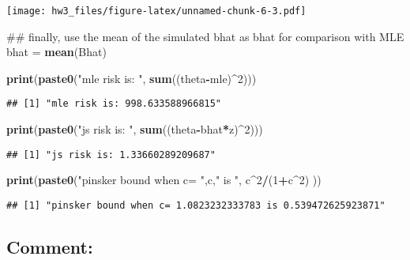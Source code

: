 \documentclass[]{article}
\newenvironment{Shaded}{\begin{snugshade}}{\end{snugshade}}
\newcommand{\KeywordTok}[1]{\textcolor[rgb]{0.13,0.29,0.53}{\textbf{#1}}}
\newcommand{\DecValTok}[1]{\textcolor[rgb]{0.00,0.00,0.81}{#1}}
\newcommand{\StringTok}[1]{\textcolor[rgb]{0.31,0.60,0.02}{#1}}
\newcommand{\OperatorTok}[1]{\textcolor[rgb]{0.81,0.36,0.00}{\textbf{#1}}}
\newcommand{\NormalTok}[1]{#1}
\begin{document}
\texttt{[image: hw3\_files/figure-latex/unnamed-chunk-6-3.pdf]}

\begin{Shaded}
\begin{Highlighting}[]
\NormalTok{## finally, use the mean of the simulated bhat as bhat for comparison with MLE  }
\NormalTok{bhat =}\StringTok{ }\KeywordTok{mean}\NormalTok{(Bhat)}

\KeywordTok{print}\NormalTok{(}\KeywordTok{paste0}\NormalTok{(}\StringTok{"mle risk is: "}\NormalTok{, }\KeywordTok{sum}\NormalTok{((theta}\OperatorTok{-}\NormalTok{mle)}\OperatorTok{^}\DecValTok{2}\NormalTok{)))}
\end{Highlighting}
\end{Shaded}

\begin{verbatim}
## [1] "mle risk is: 998.633588966815"
\end{verbatim}

\begin{Shaded}
\begin{Highlighting}[]
\KeywordTok{print}\NormalTok{(}\KeywordTok{paste0}\NormalTok{(}\StringTok{"js risk is: "}\NormalTok{, }\KeywordTok{sum}\NormalTok{((theta}\OperatorTok{-}\NormalTok{bhat}\OperatorTok{*}\NormalTok{z)}\OperatorTok{^}\DecValTok{2}\NormalTok{)))}
\end{Highlighting}
\end{Shaded}

\begin{verbatim}
## [1] "js risk is: 1.33660289209687"
\end{verbatim}

\begin{Shaded}
\begin{Highlighting}[]
\KeywordTok{print}\NormalTok{(}\KeywordTok{paste0}\NormalTok{(}\StringTok{"pinsker bound when c= "}\NormalTok{,c,}\StringTok{" is "}\NormalTok{, c}\OperatorTok{^}\DecValTok{2}\OperatorTok{/}\NormalTok{(}\DecValTok{1}\OperatorTok{+}\NormalTok{c}\OperatorTok{^}\DecValTok{2}\NormalTok{) ))}
\end{Highlighting}
\end{Shaded}

\begin{verbatim}
## [1] "pinsker bound when c= 1.0823232333783 is 0.539472625923871"
\end{verbatim}

\subsection{Comment:}\label{comment-1}
\end{document}
